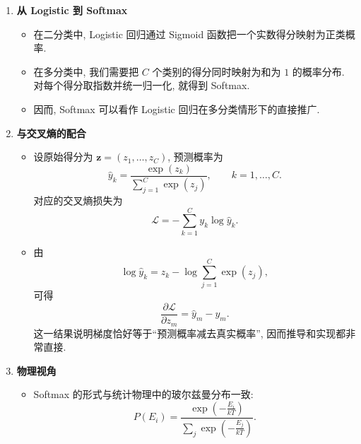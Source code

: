 \documentclass{../nndlcourse}
\begin{document}
\begin{enumerate}
\begin{itemize}
\begin{equation*}
        \end{equation*}
        \item 这表明 Softmax 只依赖各类别得分之间的相对差异. 实际计算中, 常先减去 $\max_i x_i$ 来避免指数溢出.
    \end{itemize}
    \item \textbf{从 Logistic 到 Softmax}
    \begin{itemize}
        \item 在二分类中, Logistic 回归通过 Sigmoid 函数把一个实数得分映射为正类概率.
        \item 在多分类中, 我们需要把 $C$ 个类别的得分同时映射为和为 $1$ 的概率分布. 对每个得分取指数并统一归一化, 就得到 Softmax.
        \item 因而, Softmax 可以看作 Logistic 回归在多分类情形下的直接推广.
    \end{itemize}
    \item \textbf{与交叉熵的配合}
    \begin{itemize}
        \item 设原始得分为 $\boldsymbol{z} = (z_1, \dots, z_C)$, 预测概率为
        \begin{equation*}
            \hat{y}_k = \frac{\exp(z_k)}{\sum_{j=1}^C \exp(z_j)}, \qquad k = 1, \dots, C.
        \end{equation*}
        对应的交叉熵损失为
        \begin{equation*}
            \mathcal{L} = -\sum_{k=1}^C y_k \log \hat{y}_k.
        \end{equation*}
        \item 由
        \begin{equation*}
            \log \hat{y}_k = z_k - \log \sum_{j=1}^C \exp(z_j),
        \end{equation*}
        可得
        \begin{equation*}
            \frac{\partial \mathcal{L}}{\partial z_m} = \hat{y}_m - y_m.
        \end{equation*}
        这一结果说明梯度恰好等于“预测概率减去真实概率”, 因而推导和实现都非常直接.
    \end{itemize}
    \item \textbf{物理视角}
    \begin{itemize}
        \item Softmax 的形式与统计物理中的玻尔兹曼分布一致:
        \begin{equation*}
            P(E_i) = \frac{\exp\left(-\frac{E_i}{kT}\right)}{\sum_j \exp\left(-\frac{E_j}{kT}\right)}.
        \end{equation*}

\end{itemize}
\end{enumerate}
\end{document}
